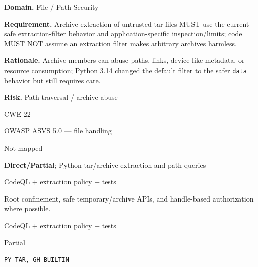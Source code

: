 \documentclass[10pt,letterpaper]{article}
\newcommand{\code}[1]{\texttt{\small #1}}
\newcommand{\prioritybadge}[2]{\tcbox[on line,boxrule=0pt,arc=1.2mm,boxsep=0.7mm,left=1mm,right=1mm,top=0.4mm,bottom=0.4mm,colback=#2!12,coltext=#2]{\scriptsize\bfseries #1}}
\begin{document}
\begin{rulebox}[title={\texttt{SCS-PY-FILE-001} \hfill \prioritybadge{High Priority}{High}}]
\textbf{Domain.} File / Path Security

\textbf{Requirement.} Archive extraction of untrusted tar files MUST use the current safe extraction-filter behavior and application-specific inspection/limits; code MUST NOT assume an extraction filter makes arbitrary archives harmless.

\textbf{Rationale.} Archive members can abuse paths, links, device-like metadata, or resource consumption; Python 3.14 changed the default filter to the safer \code{data} behavior but still requires care.

\textbf{Risk.} Path traversal / archive abuse

\begin{description}[leftmargin=2.65cm,labelwidth=2.3cm,style=nextline,itemsep=1pt,topsep=3pt]
  \item[CWE] CWE-22
  \item[OWASP] OWASP ASVS 5.0 --- file handling
  \item[CERT] Not mapped
  \item[CodeQL] \textbf{Direct/Partial}; Python tar/archive extraction and path queries
  \item[Enforcement] CodeQL + extraction policy + tests
  \item[Prevention] Root confinement, safe temporary/archive APIs, and handle-based authorization where possible.
  \item[Verification] CodeQL + extraction policy + tests
  \item[Automation] Partial
  \item[Sources] \texttt{PY-TAR, GH-BUILTIN}
\end{description}
\end{rulebox}
\end{document}

